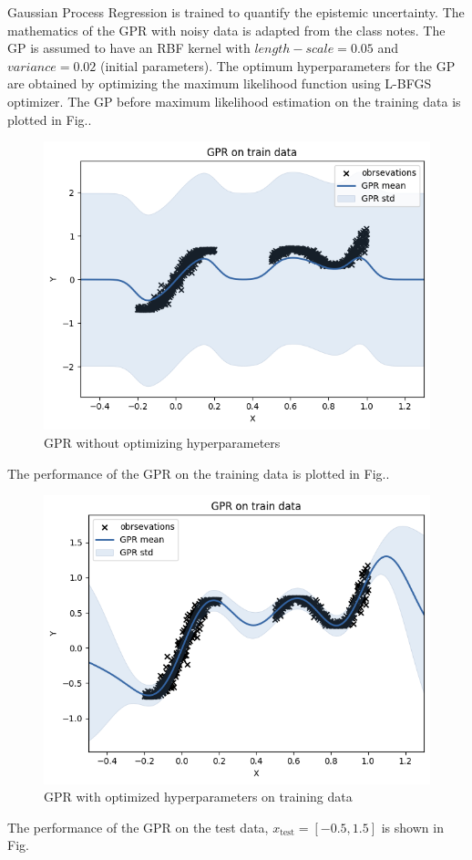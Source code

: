\documentclass[11pt,a4paper]{article}
\begin{document}
Gaussian Process Regression is trained to quantify the epistemic uncertainty. The mathematics of the GPR with noisy data is adapted from the class notes. The GP is assumed to have an RBF kernel with $length-scale=0.05$ and $variance = 0.02$ (initial parameters). The optimum hyperparameters for the GP are obtained by optimizing the maximum likelihood function using L-BFGS optimizer. The GP before maximum likelihood estimation on the training data is plotted in Fig.\fbox{\ref{fig:crude gpr}}.
\begin{figure}[h!]
    \centering
    \includegraphics[scale=0.5]{gpr unoptimized.png}
    \caption{GPR without optimizing hyperparameters}
    \label{fig:crude gpr}
\end{figure}
The performance of the GPR on the training data is plotted in Fig.\fbox{\ref{fig:gpr mle train}}.
\begin{figure}
    \centering[h!]
    \includegraphics[scale=0.5]{gpr train.png}
    \caption{GPR with optimized hyperparameters on training data}
    \label{fig:gpr mle train}
\end{figure}
The performance of the GPR on the test data, $x_{\text{test}} = [-0.5,1.5]$ is shown in Fig.\fbox{\ref{fig:gpr mle test}}
\end{document}
